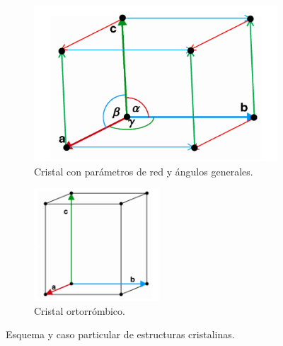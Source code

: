 \documentclass[a4paper]{article}
\begin{document}
\begin{figure}[H]
  \centering
  \begin{subfigure}[b]{0.4\linewidth}
    \includegraphics[width=\linewidth]{tetragonal.png}
     \caption{Cristal con par\'ametros de red y \'angulos generales.}
  \end{subfigure}
  \begin{subfigure}[b]{0.35\linewidth}
    \includegraphics[width=\linewidth]{ortorrombico.png}
    \caption{Cristal ortorr\'ombico.}
  \end{subfigure}
  \caption{Esquema y caso particular de estructuras cristalinas.}
  \label{fig:ortorrombico}
\end{figure}
\end{document}
